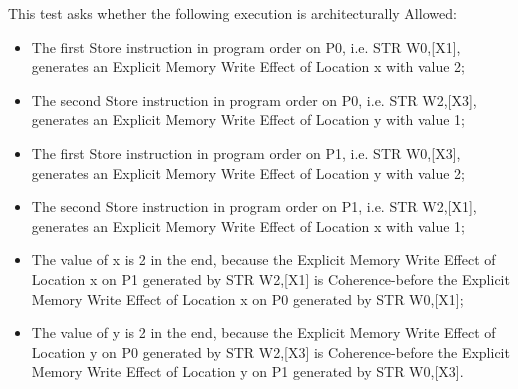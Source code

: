 This test asks whether the following execution is architecturally Allowed:

\begin{itemize}
  \item The first Store instruction in program order on P0, i.e. STR W0,[X1], generates an Explicit Memory Write Effect of Location x with value 2;
  \item The second Store instruction in program order on P0, i.e. STR W2,[X3], generates an Explicit Memory Write Effect of Location y with value 1;
  \item The first Store instruction in program order on P1, i.e. STR W0,[X3], generates an Explicit Memory Write Effect of Location y with value 2;
  \item The second Store instruction in program order on P1, i.e. STR W2,[X1], generates an Explicit Memory Write Effect of Location x with value 1;
  \item The value of x is 2 in the end, because the Explicit Memory Write Effect of Location x on P1 generated by STR W2,[X1] is Coherence-before the Explicit Memory Write Effect of Location x on P0 generated by STR W0,[X1];
  \item The value of y is 2 in the end, because the Explicit Memory Write Effect of Location y on P0 generated by STR W2,[X3] is Coherence-before the Explicit Memory Write Effect of Location y on P1 generated by STR W0,[X3].
\end{itemize}

